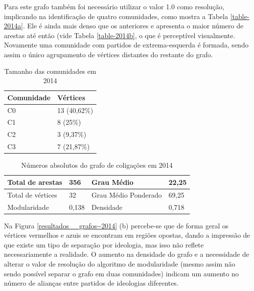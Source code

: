 
Para este grafo também foi necessário utilizar o valor 1.0 como resolução, implicando na identificação de quatro comunidades, como mostra a Tabela \ref{table-2014a}. Ele é ainda mais denso que os anteriores e apresenta o maior número de arestas até então (vide Tabela \ref{table-2014b}, o que é perceptível visualmente. Novamente uma comunidade com partidos de extrema-esquerda é formada, sendo assim o único agrupamento de vértices distantes do restante do grafo. 
\begin{table}[H]
\centering
\label{table-2010b}
\begin{tabular}{|l|l|}
\hline
Comunidade & Vértices \\ \hline
C0         &     13 (40,62\%)                \\ \hline
C1         &     8 (25\%)                \\ \hline
C2         &       3 (9,37\%)               \\ \hline
C3         &       7 (21,87\%)               \\ \hline
\end{tabular}
\caption{Tamanho das comunidades em 2014}
\end{table}


\begin{table}[H]
\centering
\label{table-2010a}
\begin{tabular}{|l|l|l|l|}
\hline
Total de arestas  & 356 & Grau Médio           & 22,25 \\ \hline
Total de vértices & 32 & Grau Médio Ponderado & 69,25 \\ \hline
Modularidade      & 0,138 & Densidade            & 0,718 \\ \hline
\end{tabular}
\caption{Números absolutos do grafo de coligações em 2014}
\end{table}

Na Figura \ref{resultados__grafos--2014} (b) percebe-se que de forma geral os vértices vermelhos e azuis se encontram em regiões opostas, dando a impressão de que existe um tipo de separação por ideologia, mas isso não reflete necessariamente a realidade. O aumento na densidade do grafo e a necessidade de alterar o valor de resolução do algoritmo  de modularidade (mesmo assim não sendo possível separar o grafo em duas comunidades) indicam um aumento no número de alianças entre partidos de ideologias diferentes. 


